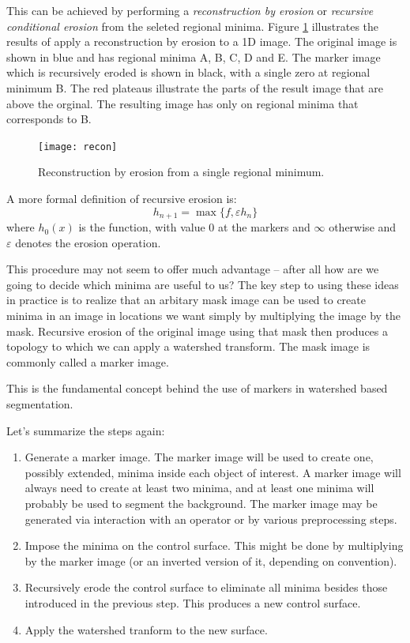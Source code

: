 \documentclass{InsightArticle}
\begin{document}
This can be achieved by performing a {\em reconstruction by erosion}
or {\em recursive conditional erosion} from the seleted regional
minima. Figure \ref{fig:recon} illustrates the results of apply a
reconstruction by erosion to a 1D image. The original image is shown
in blue and has regional minima A, B, C, D and E. The marker image
which is recursively eroded is shown in black, with a single zero at
regional minimum B. The red plateaus illustrate the parts of the
result image that are above the orginal. The resulting image has only
on regional minima that corresponds to B.
\begin{figure}[htbp]
\begin{center}
\texttt{[image: recon]}
\caption{Reconstruction by erosion from a single regional minimum.}
\label{fig:recon}
\end{center}
\end{figure}

A more formal definition of recursive erosion is:
\begin{equation}
\label{eq:recon_erosion}
h_{n+1}=\max\{f, \varepsilon h_n\}
\end{equation}
where $h_0(x)$ is the function, with value 0 at the markers and
$\infty$ otherwise and $\varepsilon$ denotes the erosion
operation.

This procedure may not seem to offer much advantage -- after all how
are we going to decide which minima are useful to us? The key step to
using these ideas in practice is to realize that an arbitary mask
image can be used to create minima in an image in locations we want
simply by multiplying the image by the mask. Recursive erosion of the
original image using that mask then produces a topology to which we
can apply a watershed transform. The mask image is commonly called a
marker image.

This is the fundamental concept behind the use of markers in watershed
based segmentation.

Let's summarize the steps again:

\begin{enumerate}
\item Generate a marker image. The marker image will be used to create 
one, possibly extended, minima inside each object of interest. A
marker image will always need to create at least two minima, and at
least one minima will probably be used to segment the background. The
marker image may be generated via interaction with an operator or by
various preprocessing steps.
\item \label{recipe:min}Impose the minima on the control surface. This 
might be done by multiplying by the marker image (or an inverted
version of it, depending on convention).
\item \label{recipe:erode}Recursively erode the control surface to eliminate all minima besides those introduced in the previous step. This produces a new control surface.
\item Apply the watershed tranform to the new surface.
\end{enumerate}
\end{document}
